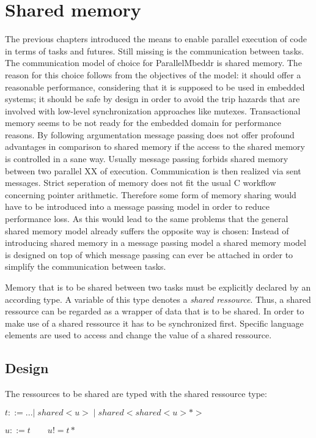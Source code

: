 \section{Shared memory}
The previous chapters introduced the means to enable parallel execution of code in terms of tasks and futures. Still missing is the communication between tasks. The communication model of choice for ParallelMbeddr is shared memory. The reason for this choice follows from the objectives of the model: it should offer a reasonable performance, considering that it is supposed to be used in embedded systems; it should be safe by design in order to avoid the trip hazards that are involved with low-level synchronization approaches like mutexes. Transactional memory seems to be not ready for the embedded domain for performance reasons. By following argumentation message passing does not offer profound advantages in comparison to shared memory if the access to the shared memory is controlled in a sane way. Usually message passing forbids shared memory between two parallel XX of execution. Communication is then realized via sent messages. Strict seperation of memory does not fit the usual C workflow concerning pointer arithmetic. Therefore some form of memory sharing would have to be introduced into a message passing model in order to reduce performance loss. As this would lead to the same problems that the general shared memory model already suffers the opposite way is chosen: Instead of introducing shared memory in a message passing model a shared memory model is designed on top of which message passing can ever be attached in order to simplify the communication between tasks.

Memory that is to be shared between two tasks must be explicitly declared by an according type. A variable of this type denotes a \textit{shared ressource}. Thus, a shared ressource can be regarded as a wrapper of data that is to be shared. In order to make use of a shared ressource it has to be synchronized first. Specific language elements are used to access and change the value of a shared ressource.

\subsection{Design}
The ressources to be shared are typed with the shared ressource type:

$ t ::= ...|\;\mathit{shared{<}u{>}}\;|\;\mathit{shared{<}shared{<}u{>}{*}{>}}\;$

$ u ::= t \qquad u != t*$

